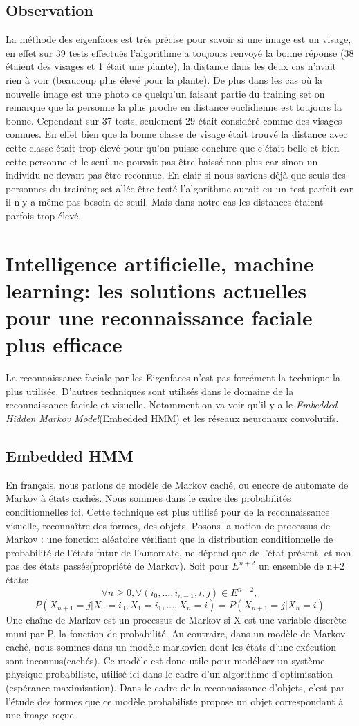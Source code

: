 \documentclass[12pt,french]{article}
\theoremstyle{plain}
\theoremstyle{definition}
\begin{document}
\subsection{Observation}
La méthode des eigenfaces est très précise pour savoir si une image est un visage, en effet sur 39 tests effectués l'algorithme a toujours renvoyé la bonne réponse (38 étaient des visages et 1 était une plante), la distance dans les deux cas n'avait rien à voir (beaucoup plus élevé pour la plante). De plus dans les cas où la nouvelle image est une photo de quelqu'un faisant partie du training set on remarque que la personne la plus proche en distance euclidienne est toujours la bonne. Cependant sur 37 tests, seulement 29 était considéré comme des visages connues. En effet bien que la bonne classe de visage était trouvé la distance avec cette classe était trop élevé pour qu'on puisse conclure que c'était belle et bien cette personne et le seuil ne pouvait pas être baissé non plus car sinon un individu ne devant pas être reconnue. En clair si nous savions déjà que seuls des personnes du training set allée être testé l'algorithme aurait eu un test parfait car il n'y a même pas besoin de seuil. Mais dans notre cas les distances étaient parfois trop élevé.


\section{Intelligence artificielle, machine learning: les solutions actuelles pour une reconnaissance faciale plus efficace}
La reconnaissance faciale par les Eigenfaces n'est pas forcément la technique la plus utilisée. D'autres techniques sont utilisés dans le domaine de la reconnaissance faciale et visuelle. Notamment on va voir qu'il y a le \textit{ Embedded Hidden Markov Model}(Embedded HMM) et les réseaux neuronaux convolutifs.
\subsection{Embedded HMM}
En français, nous parlons de modèle de Markov caché, ou encore de automate de Markov à états cachés. Nous sommes dans le cadre des probabilités conditionnelles ici. Cette technique est plus utilisé pour de la reconnaissance visuelle, reconnaître des formes, des objets.
Posons la notion de processus de Markov : une fonction aléatoire vérifiant que la distribution conditionnelle de probabilité de l'états futur de l'automate, ne dépend que de l'état présent, et non pas des états passés(propriété de Markov). Soit pour $E^{n+2}$ un ensemble de n+2 états:
\[
  \forall n\geq0, \forall(i_0,..., i_{n-1}, i, j)\in E^{n+2},
\]
\[
  P(X_{n+1}=j | X_0=i_0, X_1=i_1, ..., X_n=i) = P(X_{n+1}=j | X_n=i)
\]
Une chaîne de Markov est un processus de Markov si X est une variable discrète muni par P, la fonction de probabilité.
Au contraire, dans un modèle de Markov caché, nous sommes dans un modèle markovien dont les états d'une exécution sont inconnus(cachés).
Ce modèle est donc utile pour modéliser un système physique probabiliste, utilisé ici dans le cadre d'un algorithme d'optimisation (espérance-maximisation).
Dans le cadre de la reconnaissance d'objets, c'est par l'étude des formes que ce modèle probabiliste propose un objet correspondant à une image reçue.
\end{document}
